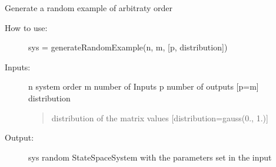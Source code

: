 \documentclass[letterpaper,10pt,english]{sphinxmanual}
\begin{document}
\begin{fulllineitems}
\label{example2sys:example2sys.generateRandomExample}
Generate a random example of arbitraty order
\begin{description}
\item[{How to use:}] \leavevmode
sys = generateRandomExample(n, m, {[}p, distribution{]})

\item[{Inputs:}] \leavevmode
n   system order
m   number of Inputs
p   number of outputs {[}p=m{]}
distribution
\begin{quote}

distribution of the matrix values {[}distribution=gauss(0., 1.){]}
\end{quote}

\item[{Output:}] \leavevmode
sys random StateSpaceSystem with the parameters set in the input

\end{description}

\end{fulllineitems}


\begin{fulllineitems}
\label{example2sys:example2sys.heatSystem}
\end{fulllineitems}


\begin{fulllineitems}
\label{example2sys:example2sys.optionPricing}
\end{fulllineitems}


\begin{fulllineitems}
\label{example2sys:example2sys.stableRandomSystem}
\end{fulllineitems}
\end{document}
